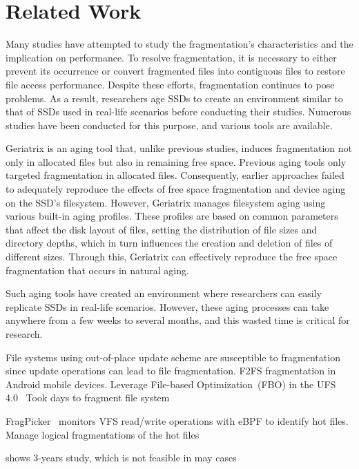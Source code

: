 \section{Related Work}
\label{s:related}

Many studies have attempted to study the fragmentation's characteristics and the implication on performance.
To resolve fragmentation, it is necessary to either prevent its occurrence or convert fragmented files into contiguous files to restore file access performance.
Despite these efforts, fragmentation continues to pose problems.
As a result, researchers age SSDs to create an environment similar to that of SSDs used in real-life scenarios before conducting their studies.
Numerous studies have been conducted for this purpose, and various tools are available.

Geriatrix\cite{geriatrix:atc18} is an aging tool that, unlike previous studies, induces fragmentation not only in allocated files but also in remaining free space.
Previous aging tools only targeted fragmentation in allocated files.
Consequently, earlier approaches failed to adequately reproduce the effects of free space fragmentation and device aging on the SSD's filesystem.
However, Geriatrix manages filesystem aging using various built-in aging profiles. These profiles are based on common parameters that affect the disk layout of files, setting the distribution of file sizes and directory depths, which in turn influences the creation and deletion of files of different sizes. Through this, Geriatrix can effectively reproduce the free space fragmentation that occurs in natural aging.


Such aging tools have created an environment where researchers can easily replicate SSDs in real-life scenarios.
However, these aging processes can take anywhere from a few weeks to several months, and this wasted time is critical for research.


File systems using out-of-place update scheme are susceptible to fragmentation since update operations can lead to file fragmentation.
\cite{f2fs-mobile:nvmsa24} F2FS fragmentation in Android mobile devices.
Leverage File-based Optimization~(FBO) in the UFS 4.0~\cite{ufs4.0}
Took days to fragment file system


FragPicker~\cite{fragpicker:sosp21} monitors VFS read/write operations with eBPF to identify hot files.
Manage logical fragmentations of the hot files


\cite{fs-aging:sigmetrics97} shows 3-years study, which is not feasible in may cases

